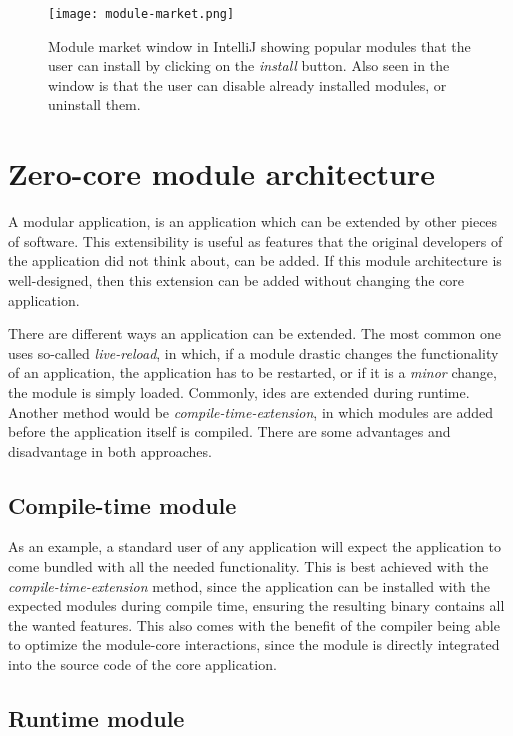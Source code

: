 \begin{figure}
  \centering
  \texttt{[image: module-market.png]}
  \caption{
    Module market window in IntelliJ showing popular modules that the user can
    install by clicking on the \textit{install} button. Also seen in the window is
    that the user can disable already installed modules, or uninstall them.
  }
  \label{pic:market}
\end{figure}


\section{Zero-core module architecture} \label{sec:architecture}

A modular application, is an application which can be extended by other pieces
of software. This extensibility is useful as features that the original
developers of the application did not think about, can be added. If this module
architecture is well-designed, then this extension can be added without changing
the core application.

There are different ways an application can be extended. The most common one
uses so-called \textit{live-reload}, in which, if a module drastic changes the
functionality of an application, the application has to be restarted, or if it
is a \textit{minor} change, the module is simply loaded. Commonly, \gls*{ide}s
are extended during runtime. Another method would be
\textit{compile-time-extension}, in which modules are added before the
application itself is compiled. There are some advantages and disadvantage in
both approaches.

\subsection{Compile-time module}

As an example, a standard user of any application will expect the application to
come bundled with all the needed functionality. This is best achieved with the
\textit{compile-time-extension} method, since the application can be installed
with the expected modules during compile time, ensuring the resulting binary
contains all the wanted features. This also comes with the benefit of the
compiler being able to optimize the module-core interactions, since the module
is directly integrated into the source code of the core application.

\subsection{Runtime module}

